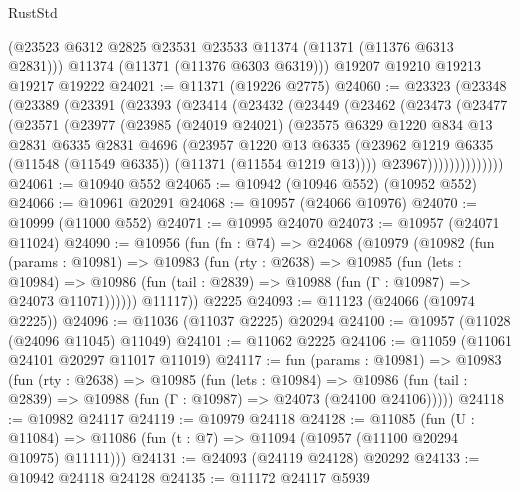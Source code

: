 \begin{lexlean}{RustStd}
\begin{coremodule}
      (@23523 @6312 @2825 @23531 @23533 @11374 (@11371 (@11376 @6313 @2831)))
      @11374
      (@11371 (@11376 @6303 @6319)))
    @19207
    @19210
    @19213
    @19217
    @19222
@24021 := @11371 (@19226 @2775)
@24060 := @23323
    (@23348
      (@23389
        (@23391
          (@23393
            (@23414
              (@23432
                (@23449
                  (@23462
                    (@23473
                      (@23477
                        (@23571
                          (@23977
                            (@23985
                              (@24019 @24021)
                              (@23575
                                @6329
                                @1220
                                @834
                                @13
                                @2831
                                @6335
                                @2831
                                @4696
                                (@23957
                                  @1220
                                  @13
                                  @6335
                                  (@23962
                                    @1219
                                    @6335
                                    (@11548 (@11549 @6335))
                                    (@11371 (@11554 @1219 @13))))
                                @23967))))))))))))))
@24061 := @10940 @552
@24065 := @10942 (@10946 @552) (@10952 @552)
@24066 := @10961 @20291
@24068 := @10957 (@24066 @10976)
@24070 := @10999 (@11000 @552)
@24071 := @10995 @24070
@24073 := @10957 (@24071 @11024)
@24090 := @10956
    (fun (fn : @74) =>
    @24068
      (@10979
        (@10982
          (fun (params : @10981) =>
          @10983
            (fun (rty : @2638) =>
            @10985
              (fun (lets : @10984) =>
              @10986 (fun (tail : @2839) => @10988 (fun (Γ : @10987) => @24073 @11071))))))
        @11117))
    @2225
@24093 := @11123 (@24066 (@10974 @2225))
@24096 := @11036 (@11037 @2225) @20294
@24100 := @10957 (@11028 (@24096 @11045) @11049)
@24101 := @11062 @2225
@24106 := @11059 (@11061 @24101 @20297 @11017 @11019)
@24117 := fun (params : @10981) =>
  @10983
    (fun (rty : @2638) =>
    @10985
      (fun (lets : @10984) =>
      @10986 (fun (tail : @2839) => @10988 (fun (Γ : @10987) => @24073 (@24100 @24106)))))
@24118 := @10982 @24117
@24119 := @10979 @24118
@24128 := @11085
    (fun (U : @11084) => @11086 (fun (t : @7) => @11094 (@10957 (@11100 @20294 @10975) @11111)))
@24131 := @24093 (@24119 @24128) @20292
@24133 := @10942 @24118 @24128
@24135 := @11172 @24117 @5939

\end{coremodule}
\end{lexlean}

